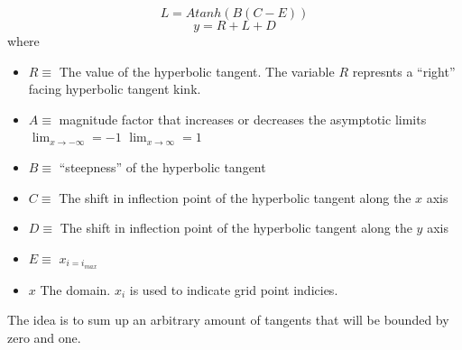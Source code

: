 \begin{equation}
    L = A tanh(B(C-E)) 
    \label{eqn:2}
\end{equation}
\begin{equation}
    y = R + L + D
    \label{eqn:3}
\end{equation}
where 
\begin{itemize}
    \item $R \equiv$ The value of the hyperbolic tangent. The variable $R$ represnts
        a ``right'' facing hyperbolic tangent kink.
    \item $A \equiv$ magnitude factor that increases or decreases the asymptotic
        limits $\lim_{x \to -\infty} = -1$ $\lim_{x \to \infty} = 1$
    \item $B \equiv$ ``steepness'' of the hyperbolic tangent
    \item $C \equiv$ The shift in inflection point of the hyperbolic tangent along the $
        x$ axis 
    \item $D \equiv$ The shift in inflection point of the hyperbolic tangent along the $
        y$ axis 
    \item $E \equiv$  $x_{i=i_{max}}$
    \item $x$ The domain. $x_i$ is used to indicate grid point indicies.
\end{itemize}
The idea is to sum up an arbitrary amount of tangents that will be bounded by zero
and one. 

\begin{figure}
    \centering
\end{figure}


